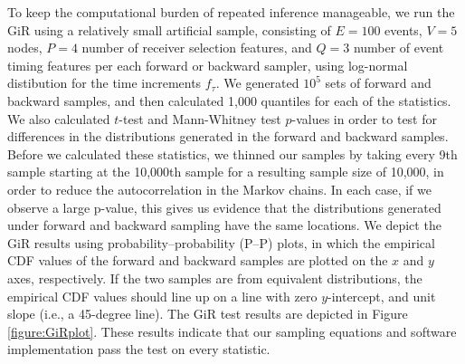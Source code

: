 \documentclass[ba]{imsart}
\numberwithin{equation}{section}
\theoremstyle{plain}
\begin{document}
	To keep the computational burden of repeated inference manageable, we run the GiR using a relatively small artificial sample, consisting of $E=100$ events, $V=5$ nodes, $P=4$ number of receiver selection features, and $Q=3$ number of event timing features per each forward or backward sampler, using log-normal distibution for the time increments $f_\tau$. We generated $10^5$ sets of forward and backward samples, and then calculated 1,000 quantiles for each of the statistics. We also calculated $t$-test and Mann-Whitney test $p$-values in order to test for differences in the distributions generated in the forward and backward samples. Before we calculated these statistics, we thinned our samples by taking every 9th sample starting at the 10,000th sample for a resulting sample size of 10,000, in order to reduce the autocorrelation in the Markov chains. In each case, if we observe a large p-value, this gives us evidence that the distributions generated under forward and backward sampling have the same locations. We depict the GiR results using probability--probability (P--P) plots, in which the empirical CDF values of the forward and backward samples are plotted on the $x$ and $y$ axes, respectively. If the two samples are from equivalent distributions, the empirical CDF values should line up on a line with zero $y$-intercept, and unit slope (i.e., a 45-degree line). The GiR test results are depicted in Figure \ref{figure:GiRplot}. These results indicate that our sampling equations and software implementation pass the test on every statistic.
\end{document}
